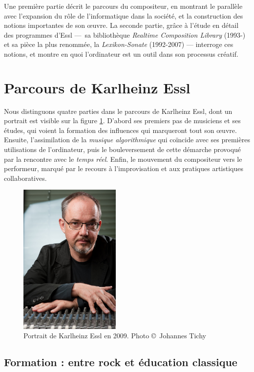 \documentclass[a4paper,12pt]{article}
\begin{document}
Une première partie décrit le parcours du compositeur, en montrant le parallèle avec l'expansion du rôle de l'informatique dans la société, et la construction des notions importantes de son œuvre. La seconde partie, grâce à l'étude en détail des programmes d'Essl ---~sa bibliothèque \emph{Realtime Composition Library} (1993-) et sa pièce la plus renommée, la \emph{Lexikon-Sonate} (1992-2007) --- interroge ces notions, et montre en quoi l'ordinateur est un outil dans son processus créatif.

\section{Parcours de Karlheinz Essl}

Nous distinguons quatre parties dans le parcours de Karlheinz Essl, dont un portrait est visible sur la figure \ref{portrait}. D'abord ses premiers pas de musiciens et ses études, qui voient la formation des influences qui marqueront tout son œuvre. Ensuite, l'assimilation de la \emph{musique algorithmique} qui coïncide avec ses premières utilisations de l'ordinateur, puis le bouleversement de cette démarche provoqué par la rencontre avec le \emph{temps réel}. Enfin, le mouvement du compositeur vers le performeur, marqué par le recours à l'improvisation et aux pratiques artistiques collaboratives.

\begin{figure}[!h]
\begin{center}
\includegraphics[width=5cm]{images/essl.jpg}
\caption{\footnotesize Portrait de Karlheinz Essl en 2009. Photo \copyright~Johannes Tichy}
\label{portrait}
\end{center}
\end{figure}

\subsection{Formation : entre rock et éducation classique}
\end{document}
